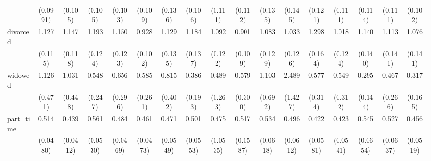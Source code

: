 {\begin{tabular}{l*{16}{c}}
                    &    (0.0991)         &     (0.105)         &     (0.105)         &     (0.103)         &     (0.109)         &     (0.136)         &     (0.106)         &     (0.111)         &     (0.112)         &     (0.135)         &     (0.145)         &     (0.121)         &     (0.111)         &     (0.114)         &     (0.111)         &     (0.102)         \\
[1em]
divorced            &       1.127         &       1.147         &       1.193         &       1.150         &       0.928         &       1.129         &       1.184         &       1.092         &       0.901         &       1.083         &       1.033         &       1.298\sym{*}  &       1.018         &       1.140         &       1.113         &       1.076         \\
                    &     (0.115)         &     (0.118)         &     (0.124)         &     (0.123)         &     (0.102)         &     (0.135)         &     (0.137)         &     (0.122)         &     (0.109)         &     (0.129)         &     (0.126)         &     (0.164)         &     (0.124)         &     (0.140)         &     (0.141)         &     (0.141)         \\
[1em]
widowed             &       1.126         &       1.031         &       0.548         &       0.656         &       0.585         &       0.815         &       0.386         &       0.489         &       0.579         &       1.103         &       2.489         &       0.577         &       0.549         &       0.295\sym{*}  &       0.467         &       0.317\sym{*}  \\
                    &     (0.471)         &     (0.448)         &     (0.247)         &     (0.296)         &     (0.261)         &     (0.402)         &     (0.193)         &     (0.263)         &     (0.300)         &     (0.692)         &     (1.427)         &     (0.314)         &     (0.312)         &     (0.144)         &     (0.266)         &     (0.165)         \\
[1em]
part\_time           &       0.514\sym{***}&       0.439\sym{***}&       0.561\sym{***}&       0.484\sym{***}&       0.461\sym{***}&       0.471\sym{***}&       0.501\sym{***}&       0.475\sym{***}&       0.517\sym{***}&       0.534\sym{***}&       0.496\sym{***}&       0.422\sym{***}&       0.423\sym{***}&       0.545\sym{***}&       0.527\sym{***}&       0.456\sym{***}\\
                    &    (0.0480)         &    (0.0412)         &    (0.0530)         &    (0.0469)         &    (0.0473)         &    (0.0549)         &    (0.0553)         &    (0.0535)         &    (0.0587)         &    (0.0618)         &    (0.0612)         &    (0.0581)         &    (0.0541)         &    (0.0654)         &    (0.0637)         &    (0.0519)         \\

\end{tabular}}
